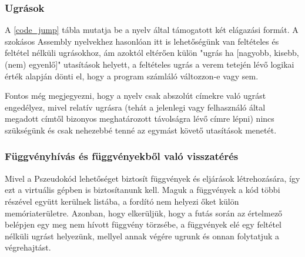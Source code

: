 \subsubsection{Ugrások}


A \ref{code_jump} tábla mutatja be a nyelv által támogatott két elágazási formát. A szokásos Assembly nyelvekhez hasonlóan itt is lehetőségünk van feltételes és feltétel nélküli ugrásokhoz, ám azoktól eltérően külön "ugrás ha [nagyobb, kisebb, (nem) egyenlő]" utasítások helyett, a feltételes ugrás a verem tetején lévő logikai érték alapján dönti el, hogy a program számláló változzon-e vagy sem.

Fontos még megjegyezni, hogy a nyelv csak abszolút címekre való ugrást engedélyez, mivel relatív ugrásra (tehát a jelenlegi vagy felhasználó által megadott címtől bizonyos meghatározott távolságra lévő címre lépni) nincs szükségünk és csak nehezebbé tenné az egymást követő utasítások menetét.

\subsubsection{Függvényhívás és függvényekből való visszatérés}


Mivel a Pszeudokód lehetőséget biztosít függvények és eljárások létrehozására, így ezt a virtuális gépben is biztosítanunk kell. Maguk a függvények a kód többi részével együtt kerülnek listába, a fordító nem helyezi őket külön memóriaterületre. Azonban, hogy elkerüljük, hogy a futás során az értelmező belépjen egy meg nem hívott függvény törzsébe, a függvények elé egy feltétel nélküli ugrást helyezünk, mellyel annak végére ugrunk és onnan folytatjuk a végrehajtást.

